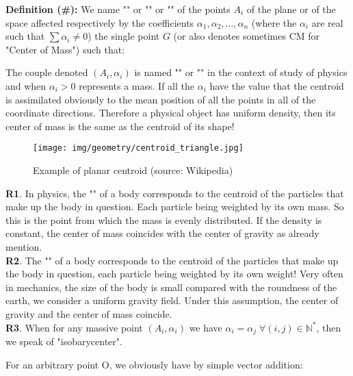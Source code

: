    \textbf{Definition (\#\mydef):} We name "" or "" or "" of the points $A_i$ of the plane or of the space affected respectively by the coefficients $\alpha_1,\alpha_2,\ldots,\alpha_n$ (where the $\alpha_i$ are real such that $\sum \alpha_i\neq 0$) the single point $G$ (or also denotes sometimes CM for "Center of Mass") such that:
	
	The couple denoted $(A_i,\alpha_i)$ is named "" or "" in the context of study of physics and when $\alpha_i>0$ represents a mass. If all the $\alpha_i$ have the value that the centroid is assimilated obviously to the  mean position of all the points in all of the coordinate directions.  Therefore a physical object has uniform density, then its center of mass is the same as the centroid of its shape!
	\begin{figure}[H]
		\centering
		\texttt{[image: img/geometry/centroid\_triangle.jpg]}
		\caption[Example of planar centroid]{Example of planar centroid (source: Wikipedia)}
	\end{figure}
	
	\begin{tcolorbox}[title=Remarks,colframe=black,arc=10pt]
	\textbf{R1}. In physics, the "" of a body corresponds to the centroid of the particles that make up the body in question. Each particle being weighted by its own mass. So this is the point from which the mass is evenly distributed. If the density is constant, the center of mass coincides with the center of gravity as already mention.\\

	\textbf{R2}. The "" of a body corresponds to the centroid of the particles that make up the body in question, each particle being weighted by its own weight! Very often in mechanics, the size of the body is small compared with the roundness of the earth, we consider a uniform gravity field. Under this assumption, the center of gravity and the center of mass coincide.\\

	\textbf{R3}. When for any massive point $(A_i,\alpha_i)$ we have $\alpha_i=\alpha_j\;\forall (i,j)\in \mathbb{N}^{*}$, then we speak of "isobarycenter".
	\end{tcolorbox}
	For an arbitrary point O, we obviously have by simple vector addition:
	
